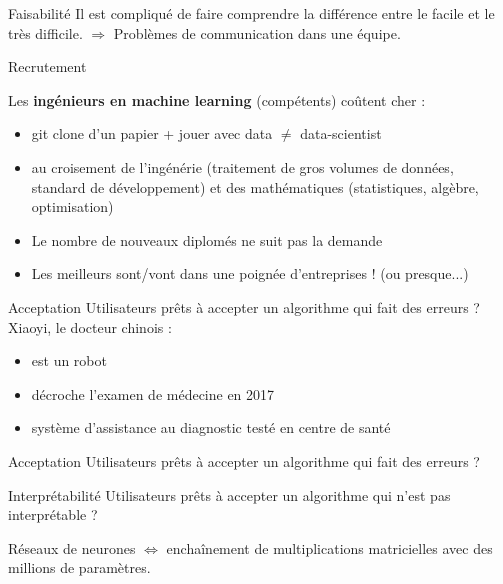\begin{frame}{Faisabilité}
  Il est compliqué de faire comprendre la différence entre le facile et le très difficile.
  $\Rightarrow$ Problèmes de communication dans une équipe.
\end{frame}

\begin{frame}{Recrutement}
  \begin{minipage}{0.62\linewidth}
    Les \textbf{ingénieurs en machine learning} (compétents) coûtent cher :
    \begin{itemize}
      \item git clone d'un papier + jouer avec data $\neq$ data-scientist
      \item au croisement de l'ingénérie (traitement de gros volumes de données, standard de développement) et des mathématiques (statistiques, algèbre, optimisation)
      \item Le nombre de nouveaux diplomés ne suit pas la demande
      \item Les meilleurs sont/vont dans une poignée d'entreprises ! (ou presque...)
    \end{itemize}
  \end{minipage}
  \begin{minipage}{0.37\linewidth}
  \end{minipage}
\end{frame}

\begin{frame}{Acceptation}
  Utilisateurs prêts à accepter un algorithme qui fait des erreurs ?
  Xiaoyi, le docteur chinois :
  \begin{itemize}
    \item est un robot
    \item décroche l'examen de médecine en 2017
    \item système d’assistance au diagnostic testé en centre de santé
  \end{itemize}
\end{frame}

\begin{frame}{Acceptation}
  Utilisateurs prêts à accepter un algorithme qui fait des erreurs ?
\end{frame}

\begin{frame}{Interprétabilité}
  Utilisateurs prêts à accepter un algorithme qui n'est pas interprétable ?

  Réseaux de neurones $\iff$ enchaînement de multiplications matricielles avec des millions de paramètres.

\end{frame}
